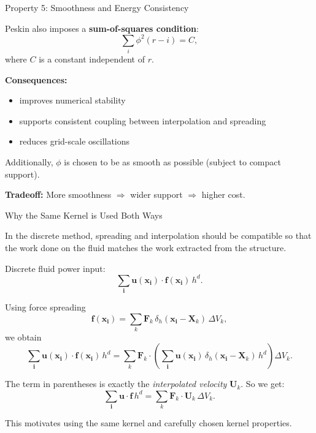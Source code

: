 \documentclass{beamer}
\begin{document}
\begin{frame}{Property 5: Smoothness and Energy Consistency}

Peskin also imposes a \textbf{sum-of-squares condition}:
\[
\sum_i \phi^2(r-i) = C,
\]
where $C$ is a constant independent of $r$.

\medskip

\textbf{Consequences:}
\begin{itemize}
    \item improves numerical stability
    \item supports consistent coupling between interpolation and spreading
    \item reduces grid-scale oscillations
\end{itemize}

\medskip

Additionally, $\phi$ is chosen to be as smooth as possible
(subject to compact support).

\medskip

\textbf{Tradeoff:}  
More smoothness $\Rightarrow$ wider support $\Rightarrow$ higher cost.

\end{frame}

\begin{frame}{Why the Same Kernel is Used Both Ways}
\small

In the discrete method, spreading and interpolation should be compatible so that
the work done on the fluid matches the work extracted from the structure.

\medskip
Discrete fluid power input:
\[
\sum_{\mathbf{i}} \mathbf{u}(\mathbf{x}_{\mathbf{i}})\cdot \mathbf{f}(\mathbf{x}_{\mathbf{i}})\,h^d.
\]

Using force spreading
\[
\mathbf{f}(\mathbf{x}_{\mathbf{i}})
=
\sum_k \mathbf{F}_k\,\delta_h(\mathbf{x}_{\mathbf{i}}-\mathbf{X}_k)\,\Delta V_k,
\]
we obtain
\[
\sum_{\mathbf{i}} \mathbf{u}(\mathbf{x}_{\mathbf{i}})\cdot \mathbf{f}(\mathbf{x}_{\mathbf{i}})\,h^d
=
\sum_k \mathbf{F}_k \cdot
\left(
\sum_{\mathbf{i}}\mathbf{u}(\mathbf{x}_{\mathbf{i}})\,\delta_h(\mathbf{x}_{\mathbf{i}}-\mathbf{X}_k)\,h^d
\right)\Delta V_k.
\]

\medskip
The term in parentheses is exactly the \emph{interpolated velocity} $\mathbf{U}_k$.
So we get:
\[
\sum_{\mathbf{i}} \mathbf{u}\cdot \mathbf{f}\,h^d
=
\sum_k \mathbf{F}_k\cdot \mathbf{U}_k\,\Delta V_k.
\]

\medskip
This motivates using the same kernel and carefully chosen kernel properties.

\end{frame}
\end{document}
